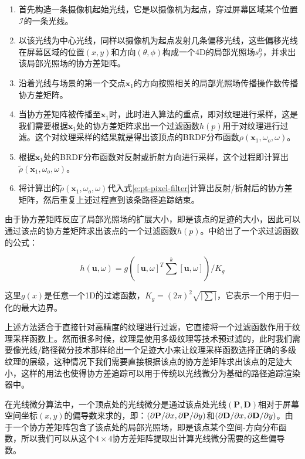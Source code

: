 \begin{enumerate}
	\item 首先构造一条摄像机起始光线，它是以摄像机为起点，穿过屏幕区域某个位置$\mathcal{I}$的一条光线。
	\item 以该光线为中心光线，同样以摄像机为起点发射几条偏移光线，这些偏移光线在屏幕区域的位置$(x,y)$和方向$(\theta,\phi)$构成一个4D的局部光照场$s^{0}_{\mathcal{I}}$，并求出该局部光照场的协方差矩阵。
	\item 沿着光线与场景的第一个交点$\mathbf{x}_1$的方向按照相关的局部光照场传播操作数传播协方差矩阵。
	\item 当协方差矩阵被传播至$\mathbf{x}_1$时，此时进入算法的重点，即对纹理进行采样，这是我们需要根据$\mathbf{x}_1$处的协方差矩阵求出一个过滤函数$h(p)$用于对纹理进行过滤。这个对纹理采样的结果就是得出该顶点的BRDF分布函数$\rho(\mathbf{x}_1,\omega_o,\omega)$。
	\item 根据$\mathbf{x}_1$处的BRDF分布函数对反射或折射方向进行采样，这个过程即计算出$\tilde{\rho}(\mathbf{x}_1,\omega_o,\omega)$。
	\item 将计算出的$\tilde{\rho}(\mathbf{x}_1,\omega_o,\omega)$代入式\ref{e:pt-pixel-filter}计算出反射/折射后的协方差矩阵，然后重复上述过程直到该条路径追踪结束。
\end{enumerate}

由于协方差矩阵反应了局部光照场的扩展大小，即是该点的足迹的大小，因此可以通过该点的协方差矩阵求出该点的一个过滤函数$h(p)$。\cite{a:AntialiasingComplexGlobalIlluminationEffectsinPath-space}中给出了一个求过滤函数的公式：

\begin{equation}
	h(\mathbf{u},\omega)=g([\mathbf{u},\omega]^{T}\sum^{k}[\mathbf{u},\omega])/K_g
\end{equation}

\noindent 这里$g(x)$是任意一个1D的过滤函数，$K_g=(2\pi)^2 \sqrt{|\sum|}$，它表示一个用于归一化的最大边界。

上述方法适合于直接针对高精度的纹理进行过滤，它直接将一个过滤函数作用于纹理采样函数上。然而很多时候，纹理是使用多级纹理等技术预过滤的，此时我们需要像光线/路径微分技术那样给出一个足迹大小来让纹理采样函数选择正确的多级纹理的层级，这种情况下我们需要直接根据该点的协方差矩阵求出该点的足迹大小，这样的用法也使得协方差追踪可以用于传统以光线微分为基础的路径追踪渲染器中。

在光线微分算法中，一个顶点处的光线微分是通过该点处光线$(\mathbf{P},\mathbf{D})$相对于屏幕空间坐标$(x,y)$的偏导数来求的，即：$({\rm \partial}\mathbf{P}/{\rm \partial} x,{\rm \partial}\mathbf{P}/{\rm \partial} y)$和$({\rm \partial}\mathbf{D}/{\rm \partial} x,{\rm \partial}\mathbf{D}/{\rm \partial} y)$。由于一个协方差矩阵包含了该点处的局部光照场，即是该点某个空间-方向分布函数，所以我们可以从这个$4\times 4$协方差矩阵提取出计算光线微分需要的这些偏导数。

